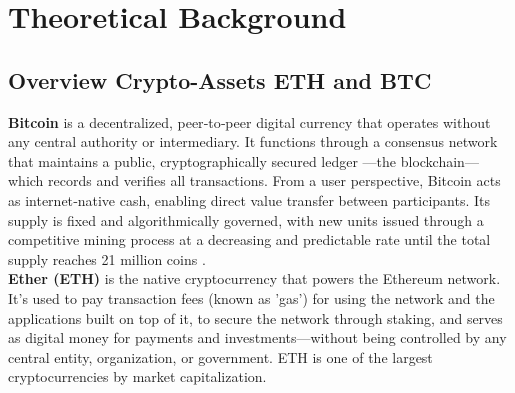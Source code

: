\documentclass[12pt,a4paper,titlepage,oneside,english]{article}
\begin{document}

\section{Theoretical Background}

\subsection{Overview Crypto-Assets ETH and BTC}
\textbf{Bitcoin} is a decentralized, peer‑to‑peer digital currency that operates without any central authority or intermediary. It functions through a consensus network that maintains a public, cryptographically secured ledger —the blockchain— which records and verifies all transactions. From a user perspective, Bitcoin acts as internet‑native cash, enabling direct value transfer between participants. Its supply is fixed and algorithmically governed, with new units issued through a competitive mining process at a decreasing and predictable rate until the total supply reaches 21 million coins \parencite{bitcoin_faq} \parencite{nakamoto2008bitcoin}.\\
\textbf{Ether (ETH)} is the native cryptocurrency that powers the Ethereum network. It's used to pay transaction fees (known as 'gas') for using the network and the applications built on top of it, to secure the network through staking, and serves as digital money for payments and investments—without being controlled by any central entity, organization, or government. ETH is one of the largest cryptocurrencies by market capitalization. \parencite{ethereum_org}\\
\end{document}
